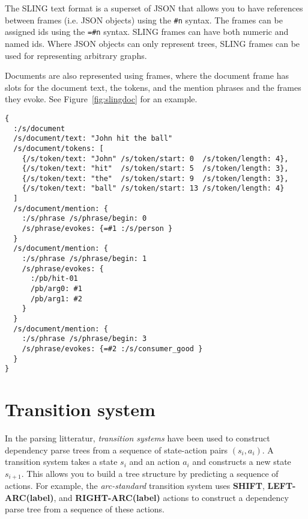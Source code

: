 \documentclass[11pt,a4paper]{article}
\begin{document}
The SLING text format is a superset of JSON that allows you to have references
between frames (i.e. JSON objects) using the {\tt \#n} syntax. The frames can be
assigned ids using the {\tt=\#n} syntax. SLING frames can have both numeric and
named ids. Where JSON objects can only represent trees, SLING frames can be used
for representing arbitrary graphs.

Documents are also represented using frames, where the document frame has slots
for the document text, the tokens, and the mention phrases and the frames they
evoke. See Figure~\ref{fig:slingdoc} for an example.

\begin{figure*}[t]
  \begin{verbatim}
{
  :/s/document
  /s/document/text: "John hit the ball"
  /s/document/tokens: [
    {/s/token/text: "John" /s/token/start: 0  /s/token/length: 4},
    {/s/token/text: "hit"  /s/token/start: 5  /s/token/length: 3},
    {/s/token/text: "the"  /s/token/start: 9  /s/token/length: 3},
    {/s/token/text: "ball" /s/token/start: 13 /s/token/length: 4}
  ]
  /s/document/mention: {
    :/s/phrase /s/phrase/begin: 0
    /s/phrase/evokes: {=#1 :/s/person }
  }
  /s/document/mention: {
    :/s/phrase /s/phrase/begin: 1
    /s/phrase/evokes: {
      :/pb/hit-01
      /pb/arg0: #1
      /pb/arg1: #2
    }
  }
  /s/document/mention: {
    :/s/phrase /s/phrase/begin: 3
    /s/phrase/evokes: {=#2 :/s/consumer_good }
  }
}
\end{verbatim}
  \caption{The text "John hit the ball" in SLING frame notation. The document
  itself is represented by a frame that has the text, an array of tokens and
  the mentions that evoke frames. There are three frames: a person frame (John),
  a consumer good frame (bat) and a hit-01 frame. The hit frame has the person
  frame as the agent (arg0) and the ball frame as the object (arg1).}
  \label{fig:slingdoc}
\end{figure*}

\section{Transition system}
\label{sec:ts}

In the parsing litteratur, \emph{transition systems} have been
used to construct dependency parse trees from a sequence of state-action pairs
$(s_i,a_i)$. A transition system takes a state $s_i$ and an action $a_i$ and
constructs a new state $s_{i+1}$. This allows you to build a tree structure by
predicting a sequence of actions. For example, the \emph{arc-standard}
transition system \cite{nivre2006} uses {\bf SHIFT}, {\bf LEFT-ARC(label)}, and
{\bf RIGHT-ARC(label)} actions to construct a dependency parse tree from a
sequence of these actions.
\end{document}
